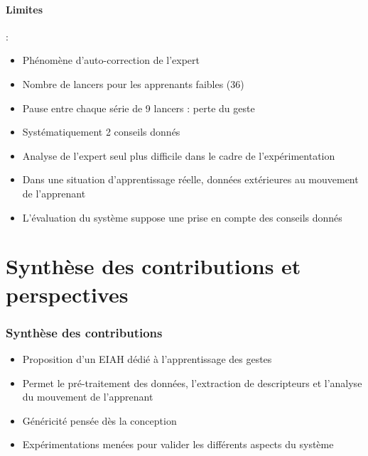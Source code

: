 \documentclass[svgnames]{beamer}
\begin{document}
	\subsection{Limites}
	\begin{frame}{\secname : \subsecname}
		\begin{itemize}[label=$\bullet$]
			\item Phénomène d'auto-correction de l'expert
			\item Nombre de lancers pour les apprenants faibles (36)
			\item Pause entre chaque série de 9 lancers : perte du geste
			\item Systématiquement 2 conseils donnés
			\item Analyse de l'expert seul plus difficile dans le cadre de l'expérimentation
			\item Dans une situation d'apprentissage réelle, données extérieures au mouvement de l'apprenant
			\item L'évaluation du système suppose une prise en compte des conseils donnés
		\end{itemize}
	\end{frame}
	
	\part{Synthèse des contributions et perspectives}
	\section{Synthèse des contributions}
	
	\begin{frame}{\secname}
		\begin{itemize}[label=$\bullet$]
			\item Proposition d'un EIAH dédié à l'apprentissage des gestes
			\item Permet le pré-traitement des données, l'extraction de descripteurs et l'analyse du mouvement de l'apprenant
			\item Généricité pensée dès la conception
			\item Expérimentations menées pour valider les différents aspects du système
		\end{itemize}
	\end{frame}
	
\end{document}
